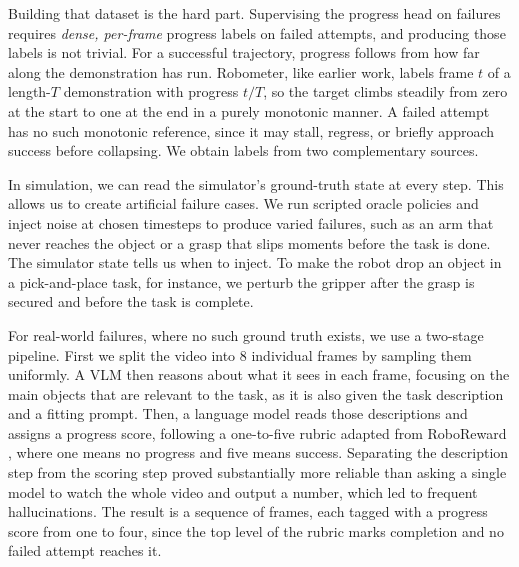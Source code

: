 Building that dataset is the hard part. Supervising the progress head on failures requires \emph{dense, per-frame} progress labels on failed attempts, and producing those labels is not trivial. For a successful trajectory, progress follows from how far along the demonstration has run. Robometer, like earlier work, labels frame $t$ of a length-$T$ demonstration with progress $t/T$, so the target climbs steadily from zero at the start to one at the end in a purely monotonic manner. A failed attempt has no such monotonic reference, since it may stall, regress, or briefly approach success before collapsing. We obtain labels from two complementary sources.

In simulation, we can read the simulator's ground-truth state at every step. This allows us to create artificial failure cases. We run scripted oracle policies and inject noise at chosen timesteps to produce varied failures, such as an arm that never reaches the object or a grasp that slips moments before the task is done. The simulator state tells us when to inject. To make the robot drop an object in a pick-and-place task, for instance, we perturb the gripper after the grasp is secured and before the task is complete. 

For real-world failures, where no such ground truth exists, we use a two-stage pipeline. First we split the video into 8 individual frames by sampling them uniformly. A VLM then reasons about what it sees in each frame, focusing on the main objects that are relevant to the task, as it is also given the task description and a fitting prompt. Then, a language model reads those descriptions and assigns a progress score, following a one-to-five rubric adapted from RoboReward \citep{roboreward}, where one means no progress and five means success. Separating the description step from the scoring step proved substantially more reliable than asking a single model to watch the whole video and output a number, which led to frequent hallucinations. The result is a sequence of frames, each tagged with a progress score from one to four, since the top level of the rubric marks completion and no failed attempt reaches it.

